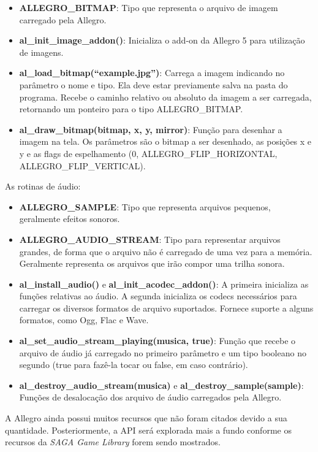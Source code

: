 \begin{itemize}
 \item \textbf{ALLEGRO\_BITMAP}: Tipo que representa o arquivo de imagem carregado pela Allegro.
 \item \textbf{al\_init\_image\_addon()}: Inicializa o add-on da Allegro 5 para utilização de imagens.
 \item \textbf{al\_load\_bitmap(``example.jpg'')}: Carrega a imagem indicando no parâmetro o nome e tipo. Ela deve estar previamente salva na pasta 
 do programa. Recebe o caminho relativo ou absoluto da imagem a ser carregada, retornando um ponteiro para o tipo ALLEGRO\_BITMAP.
 \item \textbf{al\_draw\_bitmap(bitmap, x, y, mirror)}: Função para desenhar a imagem na tela. Os parâmetros são o bitmap a ser desenhado, as 
 posições x e y e as flags de espelhamento (0, ALLEGRO\_FLIP\_HORIZONTAL, ALLEGRO\_FLIP\_VERTICAL).
\end{itemize}
% 
As rotinas de áudio:
%
\begin{itemize}
 \item \textbf{ALLEGRO\_SAMPLE}: Tipo que representa arquivos pequenos, geralmente efeitos sonoros.
 \item \textbf{ALLEGRO\_AUDIO\_STREAM}: Tipo para representar arquivos grandes, de forma que o arquivo não é carregado de uma vez para a 
 memória. Geralmente representa os arquivos que irão compor uma trilha sonora.
 \item \textbf{al\_install\_audio()} e \textbf{al\_init\_acodec\_addon()}: A primeira inicializa as funções relativas ao áudio. A segunda inicializa os 
 codecs necessários para carregar os diversos formatos de arquivo suportados. Fornece suporte a alguns formatos, como Ogg, Flac e Wave.
 \item \textbf{al\_set\_audio\_stream\_playing(musica, true)}: Função que recebe o arquivo de áudio já carregado no primeiro parâmetro e um tipo 
 booleano no segundo (true para fazê-la tocar ou false, em caso contrário).
 \item \textbf{al\_destroy\_audio\_stream(musica) } e \textbf{al\_destroy\_sample(sample)}: Funções de desalocação dos arquivo de áudio carregados 
 pela Allegro.
\end{itemize}
%
%
A Allegro ainda possui muitos recursos que não foram citados devido a sua quantidade. Posteriormente, a API será explorada mais a fundo conforme os recursos da \textit{SAGA Game Library} forem sendo mostrados.
%
%
